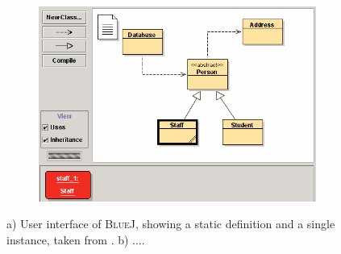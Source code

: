 \begin{figure}[b!]
	\centering
	
	\begin{subfigure}[b]{0.45\textwidth}
		\centering
        \includegraphics[width=\textwidth]{../images/06-Koelling-BlueJ}
        \caption[User interface of \textsc{BlueJ}]{}
		\label{fig:BlueJ}
	\end{subfigure}
	\quad
	\begin{subfigure}[b]{0.45\textwidth}
		\centering
		\caption[User interface of \textsc{Jeliot3}]{}
		\label{fig:Jeliot3}
	\end{subfigure}
	
	\caption[TOC Caption]{
		a) User interface of \textsc{BlueJ}, showing a static definition and a single instance, taken from \cite{kolling_bluej_2003}.
		b) ....
	}
\end{figure}


